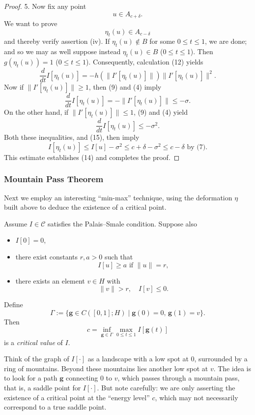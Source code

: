 \begin{proof}
5. Now fix any point
\[
u \in A_{c+\delta}.
\tag{13}
\]
We want to prove
\[
\eta_t(u) \in A_{c-\delta}
\tag{14}
\]
and thereby verify assertion (iv). If $\eta_t(u) \notin B$ for some $0 \leq t \leq 1$, we are done; and so we may as well suppose instead $\eta_t(u) \in B$ ($0 \leq t \leq 1$). Then $g(\eta_t(u)) = 1$ ($0 \leq t \leq 1$). Consequently, calculation (12) yields
\[
\frac{d}{dt}I[\eta_t(u)] = -h(\|I'[\eta_t(u)]\|)\|I'[\eta_t(u)]\|^2.
\tag{15}
\]
Now if $\|I'[\eta_t(u)]\| \geq 1$, then (9) and (4) imply
\[
\frac{d}{dt}I[\eta_t(u)] = -\|I'[\eta_t(u)]\| \leq -\sigma.
\]
On the other hand, if $\|I'[\eta_t(u)]\| \leq 1$, (9) and (4) yield
\[
\frac{d}{dt}I[\eta_t(u)] \leq -\sigma^2.
\]
Both these inequalities, and (15), then imply
\[
I[\eta_t(u)] \leq I[u] - \sigma^2 \leq c + \delta - \sigma^2 \leq c - \delta \text{ by (7)}.
\]
This estimate establishes (14) and completes the proof.
\end{proof}

\subsubsection{Mountain Pass Theorem}

Next we employ an interesting ``min-max'' technique, using the deformation $\eta$ built above to deduce the existence of a critical point.

\begin{theorem}
\label{thm:mountain-pass-theorem}
Assume $I \in \mathcal{C}$ satisfies the Palais--Smale condition. Suppose also
\begin{itemize}
\item[(i)] $I[0] = 0$,
\item[(ii)] there exist constants $r, a > 0$ such that
\[
I[u] \geq a \text{ if } \|u\| = r,
\]
\item[(iii)] there exists an element $v \in H$ with
\[
\|v\| > r, \quad I[v] \leq 0.
\]
\end{itemize}
Define
\[
\Gamma := \{\mathbf{g} \in C([0,1]; H) \mid \mathbf{g}(0) = 0, \, \mathbf{g}(1) = v\}.
\]
Then
\[
c = \inf_{\mathbf{g} \in \Gamma} \max_{0 \le t \le 1} I[\mathbf{g}(t)]
\]
is a \textit{critical value} of $I$.
\end{theorem}

Think of the graph of $I[\cdot]$ as a landscape with a low spot at $0$, surrounded by a ring of mountains. Beyond these mountains lies another low spot at $v$. The idea is to look for a path $\mathbf{g}$ connecting $0$ to $v$, which passes through a mountain pass, that is, a saddle point for $I[\cdot]$. But note carefully: we are only asserting the existence of a critical point at the ``energy level'' $c$, which may not necessarily correspond to a true saddle point.

